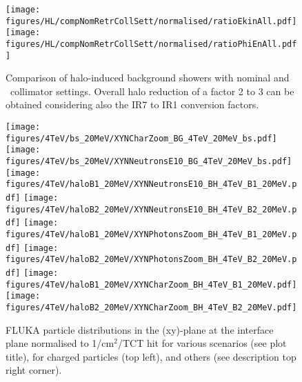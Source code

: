 \begin{figure}
\centering
\texttt{[image: figures/HL/compNomRetrCollSett/normalised/ratioEkinAll.pdf]}
\texttt{[image: figures/HL/compNomRetrCollSett/normalised/ratioPhiEnAll.pdf]}
 \caption{Comparison of halo-induced background showers with nominal and \twosigmaret~collimator settings. Overall halo reduction of a factor 2 to 3 can be obtained considering also the IR7 to IR1 conversion factors\label{fig:compNomRetrSett2}.}
\end{figure}



\begin{figure}
  \begin{center}
    \texttt{[image: figures/4TeV/bs\_20MeV/XYNCharZoom\_BG\_4TeV\_20MeV\_bs.pdf]}
    \texttt{[image: figures/4TeV/bs\_20MeV/XYNNeutronsE10\_BG\_4TeV\_20MeV\_bs.pdf]}
    \texttt{[image: figures/4TeV/haloB1\_20MeV/XYNNeutronsE10\_BH\_4TeV\_B1\_20MeV.pdf]}
    \texttt{[image: figures/4TeV/haloB2\_20MeV/XYNNeutronsE10\_BH\_4TeV\_B2\_20MeV.pdf]}
    \texttt{[image: figures/4TeV/haloB1\_20MeV/XYNPhotonsZoom\_BH\_4TeV\_B1\_20MeV.pdf]}
    \texttt{[image: figures/4TeV/haloB2\_20MeV/XYNPhotonsZoom\_BH\_4TeV\_B2\_20MeV.pdf]}
    \texttt{[image: figures/4TeV/haloB1\_20MeV/XYNCharZoom\_BH\_4TeV\_B1\_20MeV.pdf]}
    \texttt{[image: figures/4TeV/haloB2\_20MeV/XYNCharZoom\_BH\_4TeV\_B2\_20MeV.pdf]}
    
\end{center}
\vspace{-0.6cm}
 \caption{FLUKA particle distributions in the (xy)-plane at the interface plane normalised to 1/cm$^{2}$/TCT hit for various scenarios (see plot title), for charged particles (top left), and others (see description top right corner).
  \label{fig:XYNPho}}
\end{figure}

